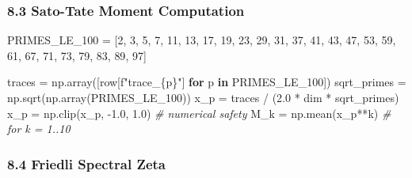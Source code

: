 \documentclass[
]{article}
\newenvironment{Shaded}{}{}
\newcommand{\CommentTok}[1]{\textcolor[rgb]{0.38,0.63,0.69}{\textit{#1}}}
\newcommand{\ControlFlowTok}[1]{\textcolor[rgb]{0.00,0.44,0.13}{\textbf{#1}}}
\newcommand{\DecValTok}[1]{\textcolor[rgb]{0.25,0.63,0.44}{#1}}
\newcommand{\FloatTok}[1]{\textcolor[rgb]{0.25,0.63,0.44}{#1}}
\newcommand{\KeywordTok}[1]{\textcolor[rgb]{0.00,0.44,0.13}{\textbf{#1}}}
\newcommand{\NormalTok}[1]{#1}
\newcommand{\OperatorTok}[1]{\textcolor[rgb]{0.40,0.40,0.40}{#1}}
\newcommand{\SpecialCharTok}[1]{\textcolor[rgb]{0.25,0.44,0.63}{#1}}
\newcommand{\SpecialStringTok}[1]{\textcolor[rgb]{0.73,0.40,0.53}{#1}}
\begin{document}
\hypertarget{sato-tate-moment-computation}{%
\subsubsection{8.3 Sato-Tate Moment
Computation}\label{sato-tate-moment-computation}}

\begin{Shaded}
\begin{Highlighting}[]
\NormalTok{PRIMES\_LE\_100 }\OperatorTok{=}\NormalTok{ [}\DecValTok{2}\NormalTok{, }\DecValTok{3}\NormalTok{, }\DecValTok{5}\NormalTok{, }\DecValTok{7}\NormalTok{, }\DecValTok{11}\NormalTok{, }\DecValTok{13}\NormalTok{, }\DecValTok{17}\NormalTok{, }\DecValTok{19}\NormalTok{, }\DecValTok{23}\NormalTok{, }\DecValTok{29}\NormalTok{, }\DecValTok{31}\NormalTok{, }\DecValTok{37}\NormalTok{,}
                 \DecValTok{41}\NormalTok{, }\DecValTok{43}\NormalTok{, }\DecValTok{47}\NormalTok{, }\DecValTok{53}\NormalTok{, }\DecValTok{59}\NormalTok{, }\DecValTok{61}\NormalTok{, }\DecValTok{67}\NormalTok{, }\DecValTok{71}\NormalTok{, }\DecValTok{73}\NormalTok{, }\DecValTok{79}\NormalTok{, }\DecValTok{83}\NormalTok{, }\DecValTok{89}\NormalTok{, }\DecValTok{97}\NormalTok{]}

\NormalTok{traces }\OperatorTok{=}\NormalTok{ np.array([row[}\SpecialStringTok{f"trace\_}\SpecialCharTok{\{}\NormalTok{p}\SpecialCharTok{\}}\SpecialStringTok{"}\NormalTok{] }\ControlFlowTok{for}\NormalTok{ p }\KeywordTok{in}\NormalTok{ PRIMES\_LE\_100])}
\NormalTok{sqrt\_primes }\OperatorTok{=}\NormalTok{ np.sqrt(np.array(PRIMES\_LE\_100))}
\NormalTok{x\_p }\OperatorTok{=}\NormalTok{ traces }\OperatorTok{/}\NormalTok{ (}\FloatTok{2.0} \OperatorTok{*}\NormalTok{ dim }\OperatorTok{*}\NormalTok{ sqrt\_primes)}
\NormalTok{x\_p }\OperatorTok{=}\NormalTok{ np.clip(x\_p, }\OperatorTok{{-}}\FloatTok{1.0}\NormalTok{, }\FloatTok{1.0}\NormalTok{)  }\CommentTok{\# numerical safety}
\NormalTok{M\_k }\OperatorTok{=}\NormalTok{ np.mean(x\_p}\OperatorTok{**}\NormalTok{k)  }\CommentTok{\# for k = 1..10}
\end{Highlighting}
\end{Shaded}

\hypertarget{friedli-spectral-zeta}{%
\subsubsection{8.4 Friedli Spectral Zeta}\label{friedli-spectral-zeta}}
\end{document}
